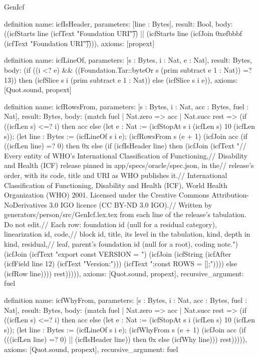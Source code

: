 \begin{lexlean}{GenIcf}
\begin{semanticmodule}
definition{
  name: icfIsHeader,
  parameters: [line : Bytes],
  result: Bool,
  body: ((icfStarts line (icfText "Foundation URI\t")) || (icfStarts line (icfJoin 0xefbbbf (icfText "Foundation URI\t")))),
  axioms: [propext]
}

definition{
  name: icfLineOf,
  parameters: [s : Bytes, i : Nat, e : Nat],
  result: Bytes,
  body: (if ((i <? e) && ((Foundation.Tar::byteOr s (prim subtract e 1 : Nat)) =? 13)) then (icfSlice s i (prim subtract e 1 : Nat)) else (icfSlice s i e)),
  axioms: [Quot.sound, propext]
}

definition{
  name: icfRowsFrom,
  parameters: [s : Bytes, i : Nat, acc : Bytes, fuel : Nat],
  result: Bytes,
  body: (match fuel
    | Nat.zero => acc
    | Nat.succ rest => (if ((icfLen s) <=? i) then acc else (let e : Nat := (icfStopAt s i (icfLen s) 10 (icfLen s)); (let line : Bytes := (icfLineOf s i e); (icfRowsFrom s (e + 1) (icfJoin acc (if ((icfLen line) =? 0) then 0x else (if (icfIsHeader line) then (icfJoin (icfText "// Every entity of WHO's International Classification of Functioning,\n// Disability and Health (ICF) release pinned in app/specs/oracle/spec.json, in the\n// release's order, with its code, title and URI as WHO publishes it.\n// International Classification of Functioning, Disability and Health (ICF), World Health Organization (WHO) 2001. Licensed under the Creative Commons Attribution-NoDerivatives 3.0 IGO licence (CC BY-ND 3.0 IGO).\n// Written by generators/person/src/GenIcf.lex.tex from each line of the release's tabulation. Do not edit.\n// Each row: foundation id (null for a residual category), linearization id, code,\n// block id, title, its level in the tabulation, kind, depth in kind, residual,\n// leaf, parent's foundation id (null for a root), coding note.\n") (icfJoin (icfText "export const VERSION = ") (icfJoin (icfString (icfAfter (icfField line 12) (icfText "Version:"))) (icfText ";\nexport const ROWS = [];\n")))) else (icfRow line)))) rest))))),
  axioms: [Quot.sound, propext],
  recursive_argument: fuel
}

definition{
  name: icfWhyFrom,
  parameters: [s : Bytes, i : Nat, acc : Bytes, fuel : Nat],
  result: Bytes,
  body: (match fuel
    | Nat.zero => acc
    | Nat.succ rest => (if ((icfLen s) <=? i) then acc else (let e : Nat := (icfStopAt s i (icfLen s) 10 (icfLen s)); (let line : Bytes := (icfLineOf s i e); (icfWhyFrom s (e + 1) (icfJoin acc (if (((icfLen line) =? 0) || (icfIsHeader line)) then 0x else (icfWhy line))) rest))))),
  axioms: [Quot.sound, propext],
  recursive_argument: fuel
}


\end{semanticmodule}
\end{lexlean}
